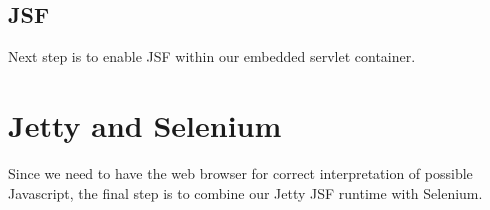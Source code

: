 \subsection{JSF}

Next step is to enable JSF within our embedded servlet container.


\section{Jetty and Selenium}
Since we need to have the web browser for correct interpretation of possible Javascript, the final step is to combine our Jetty JSF runtime with Selenium.
